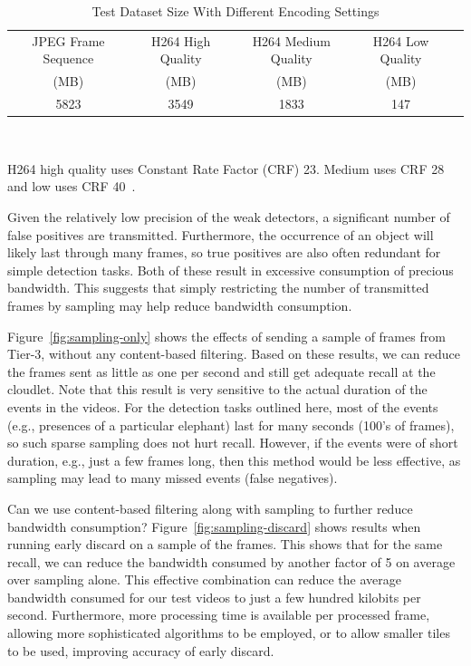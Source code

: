 \begin{table}
    \centering
    \begin{tabular}{|c|c|c|c|c|}
        \hline
        JPEG Frame Sequence & H264 High Quality & H264 Medium Quality & H264 Low Quality \\
        (MB)                & (MB)              & (MB)                & (MB)             \\
        \hline
        5823                & 3549              & 1833                & 147              \\
        \hline
    \end{tabular}\\
    \vspace{0.1in}
    \begin{captiontext}
        H264 high quality uses Constant Rate Factor (CRF) 23. Medium
        uses CRF 28 and low uses CRF 40~\cite{Merritt2007}.
    \end{captiontext}
    \caption{Test Dataset Size With Different Encoding Settings}
    \label{fig:video-vs-images}
\end{table}

Given the relatively low precision of the weak detectors, a significant number
of false positives are transmitted.  Furthermore, the occurrence of an object will
likely last through many frames, so true positives are also often redundant for
simple detection tasks.  Both of these result in excessive
consumption of precious bandwidth.
This suggests that simply restricting the number of transmitted
frames by sampling may help reduce bandwidth consumption.

Figure~\ref{fig:sampling-only} shows the effects of
sending a sample of frames from Tier-3, without any
content-based filtering.  Based on these results, we can reduce
the frames sent as little as one per second and still get
adequate recall at the cloudlet.  Note that this result is very
sensitive to the actual duration of the events in the videos.
For the detection tasks outlined here, most of the events (e.g.,
presences of a particular elephant) last for many seconds (100's
of frames), so such sparse sampling does not hurt recall.
However, if the events were of short duration, e.g., just a few
frames long, then this method would be less effective, as
sampling may lead to many missed events (false negatives).

Can we use content-based filtering along with sampling to further
reduce bandwidth consumption?  Figure~\ref{fig:sampling-discard}
shows results when running early discard on a sample of the
frames. This shows that for the same recall, we can reduce the
bandwidth consumed by another factor of 5 on average over sampling alone.
This effective combination can reduce the average bandwidth
consumed for our test videos to just a few hundred kilobits
per second.  Furthermore, more processing time is available per
processed frame, allowing more sophisticated algorithms to be
employed, or to allow smaller tiles to be used, improving
accuracy of early discard.


